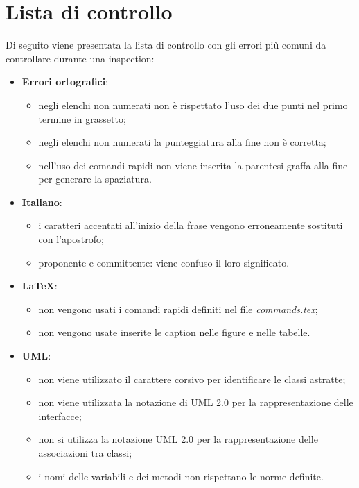 \section{Lista di controllo} %
\label{sec:lista_di_controllo}
Di seguito viene presentata la lista di controllo con gli errori più comuni da controllare durante una inspection:
	\begin{itemize}
		\item \textbf{Errori ortografici}:
			\begin{itemize}
				\item negli elenchi non numerati non è rispettato l'uso dei due punti nel primo termine in grassetto;
				\item negli elenchi non numerati la punteggiatura alla fine non è corretta;
				\item nell'uso dei comandi rapidi non viene inserita la parentesi graffa alla fine per generare la spaziatura.
			\end{itemize}

		\item \textbf{Italiano}:
			\begin{itemize}
				\item i caratteri accentati all'inizio della frase vengono erroneamente sostituti con l'apostrofo;
				\item proponente e committente: viene confuso il loro significato.
			\end{itemize}

		\item \textbf{\LaTeX}:
			\begin{itemize}
				\item non vengono usati i comandi rapidi definiti nel file \emph{commands.tex};
				\item non vengono usate inserite le caption nelle figure e nelle tabelle.
			\end{itemize}

		\item \textbf{UML}:
			\begin{itemize}
				\item non viene utilizzato il carattere corsivo per identificare le classi astratte;
				\item non viene utilizzata la notazione di UML 2.0 per la rappresentazione delle interfacce;
				\item non si utilizza la notazione UML 2.0 per la rappresentazione delle associazioni tra classi;
				\item i nomi delle variabili e dei metodi non rispettano le norme definite.
			\end{itemize}
	\end{itemize}
